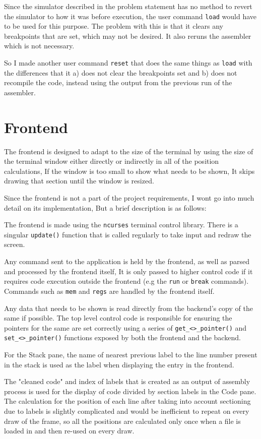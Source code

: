 \documentclass[12pt]{article}
\begin{document}
	Since the simulator described in the problem statement has no method to revert the simulator to how it was before execution, the user command \verb|load| would have to be used for this purpose. The problem with this is that it clears any breakpoints that are set, which may not be desired. It also reruns the assembler which is not necessary.

	So I made another user command \verb|reset| that does the same things as \verb|load| with the differences that it a) does not clear the breakpoints set and b) does not recompile the code, instead using the output from the previous run of the assembler.

	\section{Frontend}

	The frontend is designed to adapt to the size of the terminal by using the size of the terminal window either directly or indirectly in all of the position calculations, If the window is too small to show what needs to be shown, It skips drawing that section until the window is resized.

	Since the frontend is not a part of the project requirements, I wont go into much detail on its implementation, But a brief description is as follows:

	The frontend is made using the \verb|ncurses| terminal control library. There is a singular \verb|update()| function that is called regularly to take input and redraw the screen.

	Any command sent to the application is held by the frontend, as well as parsed and processed by the frontend itself, It is only passed to higher control code if it requires code execution outside the frontend (e.g the \verb|run| or \verb|break| commands). Commands such as \verb|mem| and \verb|regs| are handled by the frontend itself.

	Any data that needs to be shown is read directly from the backend's copy of the same if possible. The top level control code is responsible for ensuring the pointers for the same are set correctly using a series of \verb|get_<>_pointer()| and \verb|set_<>_pointer()| functions exposed by both the frontend and the backend.

	For the Stack pane, the name of nearest previous label to the line number present in the stack is used as the label when displaying the entry in the frontend.

	The "cleaned code" and index of labels that is created as an output of assembly process is used for the display of code divided by section labels in the Code pane. The calculation for the position of each line after taking into account sectioning due to labels is slightly complicated and would be inefficient to repeat on every draw of the frame, so all the positions are calculated only once when a file is loaded in and then re-used on every draw.
\end{document}
